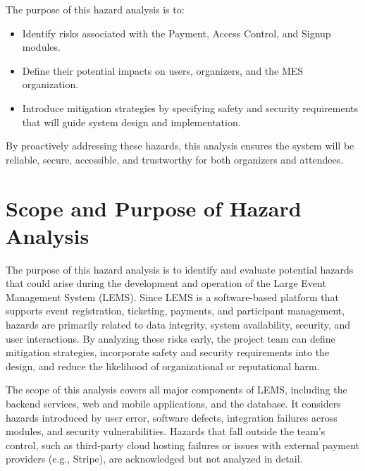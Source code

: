 \documentclass{article}
\begin{document}
\noindent
The purpose of this hazard analysis is to:

\begin{itemize}
    \item Identify risks associated with the Payment, Access Control, and Signup modules.
    \item Define their potential impacts on users, organizers, and the MES organization.
    \item Introduce mitigation strategies by specifying safety and security requirements that
     will guide system design and implementation.
\end{itemize}

\noindent
By proactively addressing these hazards, this analysis ensures the system will be reliable, secure, accessible, and trustworthy for both organizers and attendees.

\section{Scope and Purpose of Hazard Analysis}


The purpose of this hazard analysis is to identify and evaluate potential hazards that could arise during 
the development and operation of the Large Event Management System (LEMS). Since LEMS is a 
software-based platform that supports event registration, ticketing, payments, and participant 
management, hazards are primarily related to data integrity, system availability, security, and user 
interactions. By analyzing these risks early, the project team can define mitigation strategies, 
incorporate safety and security requirements into the design, and reduce the likelihood of 
organizational or reputational harm.

\par
\vspace{1em}

The scope of this analysis covers all major components of LEMS, including the backend services, 
web and mobile applications, and the database. It considers hazards introduced by user error, software 
defects, integration failures across modules, and security vulnerabilities. Hazards that fall outside the 
team’s control, such as third-party cloud hosting failures or issues with external payment providers 
(e.g., Stripe), are acknowledged but not analyzed in detail.

\par
\vspace{1em}
\end{document}
